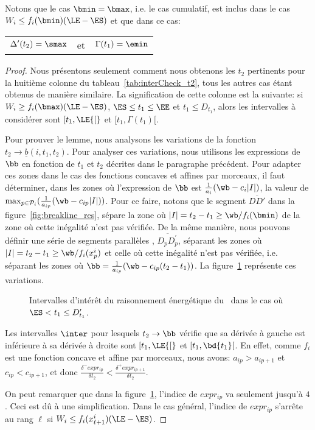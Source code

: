 Notons que le cas $\bmin=\bmax$, i.e. le cas cumulatif, est inclus
dans le cas $W_i \le f_i(\bmin)(\LE - \ES )$ et que dans ce cas: 
\begin{center}
\begin{tabular}{lcr}
$\Delta'(t_2)=\smax$ & et &
$\Gamma(t_1)=\emin$
\end{tabular}
\end{center}
 \begin{proof}
Nous présentons seulement comment nous obtenons les $t_2$ pertinents
pour la huitième colonne du tableau~\ref{tab:interCheck_t2}, tous les
autres cas étant obtenus de manière similaire. La signification de
cette colonne est la suivante: si $W_i \ge f_i(\bmax)(\LE-\ES)$, $\ES
\le t_1 \le \EE$ et $t_1 \le D_{t_1}$, alors les intervalles à
considérer sont $[t_1,\LE {[}$ et $[t_1, \Gamma(t_1){[}$.

Pour prouver le lemme, nous analysons les variations de la fonction
$t_2 \rightarrow \underline{b}(i,t_1,t_2)$. Pour analyser ces
variations, nous utilisons les expressions de $\bb$ en fonction de
$t_1$ et $t_2$ décrites dans le paragraphe précédent. Pour adapter ces
zones dans le cas des fonctions concaves et affines par morceaux, il
faut déterminer, dans les zones où l'expression de $\bb$ est
$\frac{1}{a_i}(\wb - c_i|I|)$, la valeur de $\max_{p \in
\P_i}(\frac{1}{a_{ip}}(\wb - c_{ip}|I|))$. Pour ce faire, notons que
le segment $\overline{DD'}$ dans la figure~\ref{fig:breakline_res},
sépare la zone où $|I|= t_2 - t_1 \ge \wb/ f_i(\bmin)$ de la zone où
cette inégalité n'est pas vérifiée. De la même manière, nous pouvons
définir une série de segments parallèles ,
$\overline{D_{p}D_{p}^{'}}$, séparant les zones où $|I|= t_2 - t_1 \ge
\wb/f_i(x_p^i)$ et celle où cette inégalité n'est pas vérifiée,
i.e. séparant les zones où $\bb= \frac{1}{a_{ip}}(\wb -
c_{ip}(t_2-t_1))$. La figure~\ref{fig:variation} représente ces
variations.
   \begin{figure}[!htb] 
     \caption{Intervalles d'intérêt du raisonnement énergétique du
\CECSP~dans le cas où $\ES <t_1 \le D'_{t_1}$.}
     \label{fig:variation}
   \end{figure}


Les intervalles $\inter$ pour lesquels $t_2 \rightarrow \bb$ vérifie
que sa dérivée à 
gauche est inférieure à sa dérivée à droite sont 
${[}t_1,\LE{[}$ et $[t_1,\bd{t_1}[$. En effet, comme $f_i$ est une
fonction concave et affine par morceaux, nous avons: $a_{ip} >
a_{ip+1}$ et $c_{ip} <c_{ip+1}$, et donc
$\frac{\delta^{-}expr_{ip}}{\delta t_2}<
\frac{\delta^{+}expr_{ip+1}}{\delta t_2}$.

On peut remarquer que dans la figure~\ref{fig:variation}, l'indice
de $expr_{ip}$ va seulement jusqu'à $4$. Ceci est dû à une
simplification. Dans le cas général, l'indice de $expr_{ip}$ s'arrête
au rang $\ell$ si $W_i \le f_i(x^i_{\ell +1})(\LE - \ES)$.
\end{proof}

